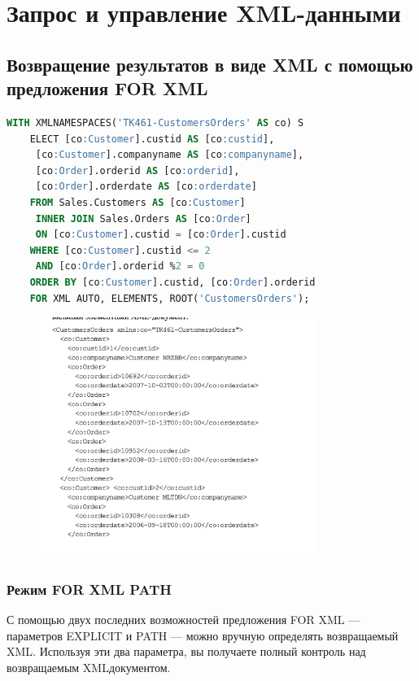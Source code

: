 \chapter{Запрос и управление XML-данными}
\section{Возвращение результатов в виде XML
с помощью предложения FOR XML}


\begin{lstlisting}[label=lst:funcReturn, language=sql]
	WITH XMLNAMESPACES('TK461-CustomersOrders' AS co) S
	ELECT [co:Customer].custid AS [co:custid],
	 [co:Customer].companyname AS [co:companyname],
	 [co:Order].orderid AS [co:orderid],
	 [co:Order].orderdate AS [co:orderdate]
	FROM Sales.Customers AS [co:Customer]
	 INNER JOIN Sales.Orders AS [co:Order]
	 ON [co:Customer].custid = [co:Order].custid
	WHERE [co:Customer].custid <= 2
	 AND [co:Order].orderid %2 = 0
	ORDER BY [co:Customer].custid, [co:Order].orderid
	FOR XML AUTO, ELEMENTS, ROOT('CustomersOrders'); 
\end{lstlisting}


\begin{figure}[h!]
	\begin{center}
		\includegraphics[width=0.8\textwidth]{img/res16.png}
	\end{center}
	\captionsetup{justification=centering}
\end{figure}


\subsection{Режим FOR XML PATH}
С помощью двух последних возможностей предложения FOR XML — параметров
EXPLICIT и PATH — можно вручную определять возвращаемый XML. Используя
эти два параметра, вы получаете полный контроль над возвращаемым XMLдокументом.


